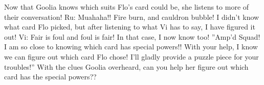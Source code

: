 


Now that Goolia knows which suits Flo’s card could be, she listens to more
of their conversation!
Ru: Muahaha!! Fire burn, and cauldron bubble! I didn’t know what card Flo
picked, but after listening to what Vi has to say, I have figured it out!
Vi: Fair is foul and foul is fair! In that case, I now know too!
”Amp’d Squad! I am so close to knowing which card has special
powers!! With your help, I know we can figure out which card Flo
chose! I’ll gladly provide a puzzle piece for your troubles!”
With the clues Goolia overheard, can you help her figure out which card has
the special powers??

